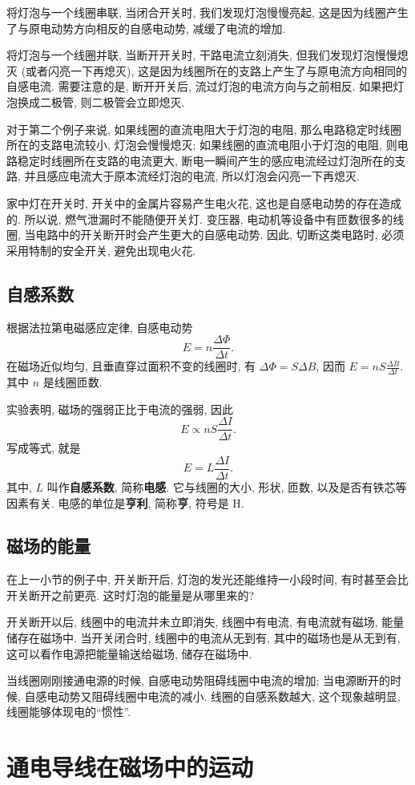 \documentclass[UTF8,openany,fontset=fandol]{ctexbook}
\theoremstyle{chinesetextbook}
\begin{document}
将灯泡与一个线圈串联, 当闭合开关时, 我们发现灯泡慢慢亮起, 这是因为线圈产生了与原电动势方向相反的自感电动势, 减缓了电流的增加.

将灯泡与一个线圈并联, 当断开开关时, 干路电流立刻消失, 但我们发现灯泡慢慢熄灭 (或者闪亮一下再熄灭), 这是因为线圈所在的支路上产生了与原电流方向相同的自感电流. 需要注意的是, 断开开关后, 流过灯泡的电流方向与之前相反. 如果把灯泡换成二极管, 则二极管会立即熄灭.

对于第二个例子来说, 如果线圈的直流电阻大于灯泡的电阻, 那么电路稳定时线圈所在的支路电流较小, 灯泡会慢慢熄灭; 如果线圈的直流电阻小于灯泡的电阻, 则电路稳定时线圈所在支路的电流更大, 断电一瞬间产生的感应电流经过灯泡所在的支路, 并且感应电流大于原本流经灯泡的电流, 所以灯泡会闪亮一下再熄灭.

家中灯在开关时, 开关中的金属片容易产生电火花, 这也是自感电动势的存在造成的. 所以说, 燃气泄漏时不能随便开关灯. 变压器, 电动机等设备中有匝数很多的线圈, 当电路中的开关断开时会产生更大的自感电动势. 因此, 切断这类电路时, 必须采用特制的安全开关, 避免出现电火花.
\subsection{自感系数}
根据法拉第电磁感应定律, 自感电动势
\[
E=n\frac {\Delta\Phi}{\Delta t}.
\]
在磁场近似均匀, 且垂直穿过面积不变的线圈时, 有 $\Delta\Phi=S\Delta B$, 因而 $\displaystyle E=nS\frac{\Delta B}{\Delta t}$. 其中 $n$ 是线圈匝数.

实验表明, 磁场的强弱正比于电流的强弱, 因此
\[
E\propto nS\frac{\Delta I}{\Delta t}.
\]
写成等式, 就是
\[
E=L\frac{\Delta I}{\Delta t}.
\]
其中, $L$ 叫作\textbf{自感系数}, 简称\textbf{电感}. 它与线圈的大小, 形状, 匝数, 以及是否有铁芯等因素有关. 电感的单位是\textbf{亨利}, 简称\textbf{亨}, 符号是 H.
\subsection{磁场的能量}
在上一小节的例子中, 开关断开后, 灯泡的发光还能维持一小段时间, 有时甚至会比开关断开之前更亮. 这时灯泡的能量是从哪里来的?

开关断开以后, 线圈中的电流并未立即消失, 线圈中有电流, 有电流就有磁场, 能量储存在磁场中. 当开关闭合时, 线圈中的电流从无到有, 其中的磁场也是从无到有, 这可以看作电源把能量输送给磁场, 储存在磁场中.

当线圈刚刚接通电源的时候, 自感电动势阻碍线圈中电流的增加; 当电源断开的时候, 自感电动势又阻碍线圈中电流的减小. 线圈的自感系数越大, 这个现象越明显, 线圈能够体现电的“惯性”.
\section{通电导线在磁场中的运动}\label{sec:切割磁感线一节}
\end{document}
